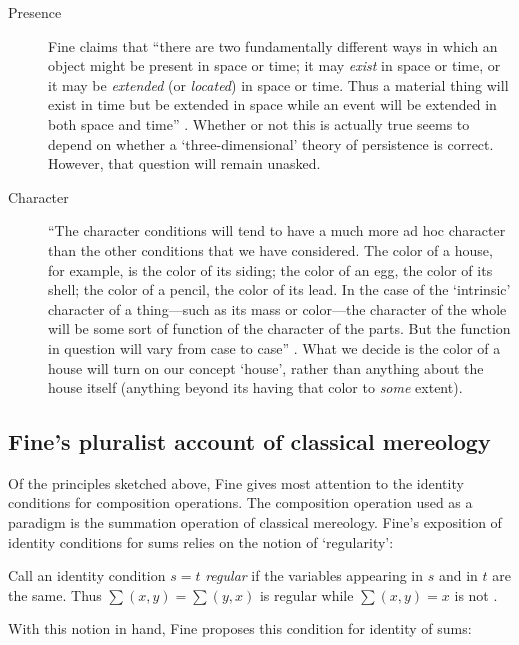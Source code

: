 \documentclass[11pt]{article}
\newenvironment{squote}{%
\begin{spacing}{1}
\begin{list}{}{%
\setlength{\labelwidth}{0pt}%
\rightmargin\leftmargin%
}
\item\relax
}{%
\end{list}%
\end{spacing}
}
\begin{document}
\begin{spacing}{1.5}
\begin{description}
  \item[Presence] Fine claims that ``there are two fundamentally
    different ways in which an object might be present in space or
    time; it may \emph{exist} in space or time, or it may be
    \emph{extended} (or \emph{located}) in space or time. Thus a
    material thing will exist in time but be extended in space while
    an event will be extended in both space and time''
    \citeyearpar[570]{fine2010}.  Whether or not this is actually true
    seems to depend on whether a `three-dimensional' theory of
    persistence is correct.  However, that question will remain unasked.
  \item[Character] ``The character conditions will tend to have a much
    more ad hoc character than the other conditions that we have
    considered. The color of a house, for example, is the color of its
    siding; the color of an egg, the color of its shell; the color of
    a pencil, the color of its lead. In the case of the `intrinsic'
    character of a thing---such as its mass or color---the character
    of the whole will be some sort of function of the character of the
    parts. But the function in question will vary from case to case''
    \citep[571]{fine2010}.  What we decide is the color of a house
    will turn on our concept `house', rather than anything about the
    house itself (anything beyond its having that color to {\em some}
    extent).
\end{description}

\subsection{Fine's pluralist account of classical mereology}
\label{classical}
Of the principles sketched above, Fine gives most attention to the
identity conditions for composition operations.  The composition
operation used as a paradigm is the summation operation of classical
mereology.  Fine's exposition of identity conditions for sums relies
on the notion of `regularity':

\begin{squote}
Call an identity condition $s = t$ {\em regular} if the variables
appearing in $s$ and in $t$ are the same.  Thus $\sum (x, y) = \sum
(y, x)$ is regular while $\sum (x, y) = x$ is not
\citeyearpar[572]{fine2010}.
\end{squote}

With this notion in hand, Fine proposes this condition for identity of
sums:


\end{spacing}
\end{document}
